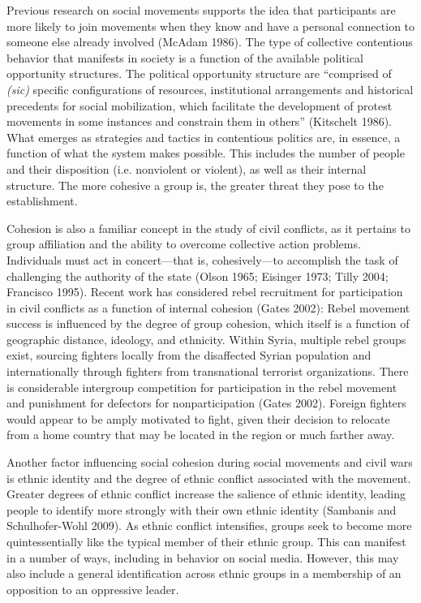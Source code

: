 \documentclass[
  english,
  man]{apa6}
\begin{document}
Previous research on social movements supports the idea that participants are
more likely to join movements when they know and have a personal connection to
someone else already involved (McAdam 1986). The type of collective
contentious behavior that manifests in society is a function of the available
political opportunity structures. The political opportunity structure are
\enquote{comprised of \emph{(sic)} specific configurations of resources, institutional
arrangements and historical precedents for social mobilization, which facilitate
the development of protest movements in some instances and constrain them in
others} (Kitschelt 1986). What emerges as strategies and tactics in
contentious politics are, in essence, a function of what the system makes
possible. This includes the number of people and their disposition (i.e.
nonviolent or violent), as well as their internal structure. The more cohesive a
group is, the greater threat they pose to the establishment.

Cohesion is also a familiar concept in the study of civil conflicts, as it
pertains to group affiliation and the ability to overcome collective action
problems. Individuals must act in concert---that is, cohesively---to
accomplish the task of challenging the authority of the state (Olson 1965; Eisinger 1973; Tilly 2004; Francisco 1995).
Recent work has considered rebel recruitment for participation in
civil conflicts as a function of internal cohesion (Gates 2002):
Rebel movement success is influenced by the degree of group cohesion, which
itself is a function of geographic distance, ideology, and ethnicity.
Within Syria, multiple rebel groups exist, sourcing fighters locally
from the disaffected Syrian population and internationally through
fighters from transnational terrorist organizations. There is considerable
intergroup competition for participation in the rebel movement and
punishment for defectors for nonparticipation (Gates 2002).
Foreign fighters would appear to be amply motivated to fight, given their
decision to relocate from a home country that may be located in the region
or much farther away.

Another factor influencing social cohesion during social movements and civil
wars is ethnic identity and the degree of ethnic conflict associated with the
movement. Greater degrees of ethnic conflict increase the salience of ethnic
identity, leading people to identify more strongly with their own ethnic
identity (Sambanis and Schulhofer-Wohl 2009). As ethnic conflict intensifies, groups seek to become
more quintessentially like the typical member of their ethnic group. This can
manifest in a number of ways, including in behavior on social media. However,
this may also include a general identification across ethnic groups in a
membership of an opposition to an oppressive leader.
\end{document}
